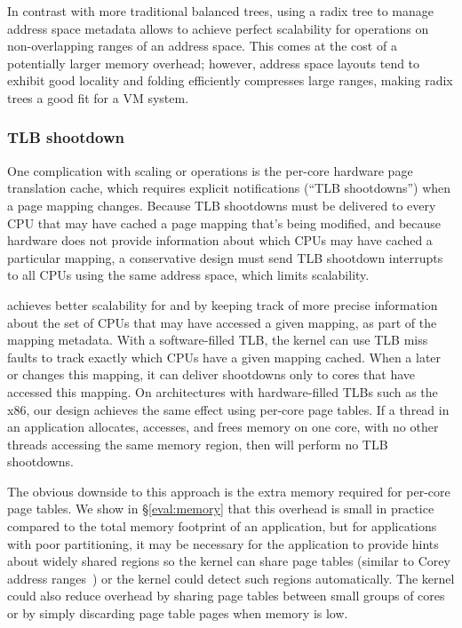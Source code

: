 In contrast with more traditional balanced trees, using a radix tree
to manage address space metadata allows \vm to achieve perfect
scalability for operations on non-overlapping ranges of an address
space.  This comes at the cost of a potentially larger memory
overhead; however, address space layouts tend to exhibit good
locality and folding efficiently compresses large ranges, making radix
trees a good fit for a VM system.

\subsubsection{TLB shootdown}
\label{sec:radixvm:tlb}

One complication with scaling  or  operations
is the per-core hardware page translation cache, which requires
explicit notifications (``TLB shootdowns'') when a page mapping changes.
Because TLB shootdowns must be delivered to every CPU that may have
cached a page mapping that's being modified, and because hardware does not provide
information about which CPUs may have cached a particular mapping,
a conservative design must send TLB shootdown interrupts to all
CPUs using the same address space, which limits scalability.

\vm achieves better scalability for  and  by
keeping track of more precise information about the set of CPUs that
may have accessed a given mapping, as part of the mapping metadata.
With a software-filled TLB, the kernel can use TLB miss faults to track
exactly which CPUs have a given mapping cached.  When a later 
or  changes this mapping, it can deliver shootdowns
only to cores that have accessed this mapping.  On architectures
with hardware-filled TLBs such as the x86, our design achieves the
same effect using per-core page tables.  If a thread in an application
allocates, accesses, and frees memory on one core, with no other threads
accessing the same memory region, then \vm will perform no TLB shootdowns.

The obvious downside to this approach is the extra memory required for
per-core page tables.  We show in \S\ref{eval:memory} that this
overhead is small in practice compared to the total memory footprint
of an application, but for applications with poor partitioning, it may
be necessary for the application to provide hints about widely shared
regions so the kernel can share page tables (similar to Corey address
ranges~\cite{boyd-wickizer:corey}) or
the kernel could detect such regions automatically.  The kernel could
also reduce overhead by sharing page tables between small groups of
cores or by simply
discarding page table pages when memory is low.

